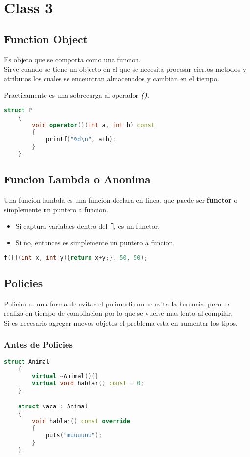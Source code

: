\section{Class 3}

\subsection{Function Object}
Es objeto que se comporta como una funcion. \\
Sirve cuando se tiene un objecto en el que se necesita procesar ciertos
metodos y atributos los cuales se enceuntran almacenados y cambian en el tiempo. \par
Practicamente es una sobrecarga al operador \textit{\textbf{()}}.
\begin{lstlisting}[language=C++, caption={Functor}]
    struct P
    {
        void operator()(int a, int b) const
        {
            printf("%d\n", a+b);
        }
    };
\end{lstlisting}


\subsection{Funcion Lambda o Anonima}
Una funcion lambda es una funcion declara en-linea, que puede ser \textbf{functor} 
o simplemente un puntero a funcion.
\begin{itemize}
    \item Si captura variables dentro del \textbf{[]}, es un functor.
    \item Si no, entonces es simplemente un puntero a funcion.
\end{itemize}
\begin{lstlisting}[language=C++, caption={Funcion lambda}]
    f([](int x, int y){return x+y;}, 50, 50);
\end{lstlisting}

\subsection{Policies}
Policies es una forma de evitar el polimorfismo
se evita la herencia, pero se realiza en tiempo de compilacion por lo que se vuelve mas
lento al compilar. \\
Si es necesario agregar nuevos objetos el problema esta en aumentar
los tipos.

\subsubsection{Antes de Policies}
\begin{lstlisting}[language=C++, caption={Before Policies}]
    struct Animal
    {
        virtual ~Animal(){}
        virtual void hablar() const = 0;
    };

    struct vaca : Animal
    {
        void hablar() const override
        {
            puts("muuuuuu");
        }
    };
\end{lstlisting}

